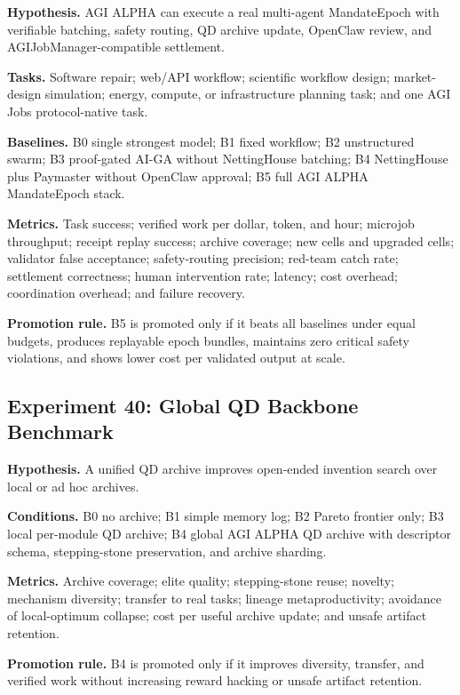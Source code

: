 \documentclass[
  11pt,
]{article}
\begin{document}
\textbf{Hypothesis.} AGI ALPHA can execute a real multi-agent
MandateEpoch with verifiable batching, safety routing, QD archive
update, OpenClaw review, and AGIJobManager-compatible settlement.

\textbf{Tasks.} Software repair; web/API workflow; scientific workflow
design; market-design simulation; energy, compute, or infrastructure
planning task; and one AGI Jobs protocol-native task.

\textbf{Baselines.} B0 single strongest model; B1 fixed workflow; B2
unstructured swarm; B3 proof-gated AI-GA without NettingHouse batching;
B4 NettingHouse plus Paymaster without OpenClaw approval; B5 full AGI
ALPHA MandateEpoch stack.

\textbf{Metrics.} Task success; verified work per dollar, token, and
hour; microjob throughput; receipt replay success; archive coverage; new
cells and upgraded cells; validator false acceptance; safety-routing
precision; red-team catch rate; settlement correctness; human
intervention rate; latency; cost overhead; coordination overhead; and
failure recovery.

\textbf{Promotion rule.} B5 is promoted only if it beats all baselines
under equal budgets, produces replayable epoch bundles, maintains zero
critical safety violations, and shows lower cost per validated output at
scale.

\subsection{Experiment 40: Global QD Backbone
Benchmark}\label{experiment-40-global-qd-backbone-benchmark}

\textbf{Hypothesis.} A unified QD archive improves open-ended invention
search over local or ad hoc archives.

\textbf{Conditions.} B0 no archive; B1 simple memory log; B2 Pareto
frontier only; B3 local per-module QD archive; B4 global AGI ALPHA QD
archive with descriptor schema, stepping-stone preservation, and archive
sharding.

\textbf{Metrics.} Archive coverage; elite quality; stepping-stone reuse;
novelty; mechanism diversity; transfer to real tasks; lineage
metaproductivity; avoidance of local-optimum collapse; cost per useful
archive update; and unsafe artifact retention.

\textbf{Promotion rule.} B4 is promoted only if it improves diversity,
transfer, and verified work without increasing reward hacking or unsafe
artifact retention.
\end{document}
